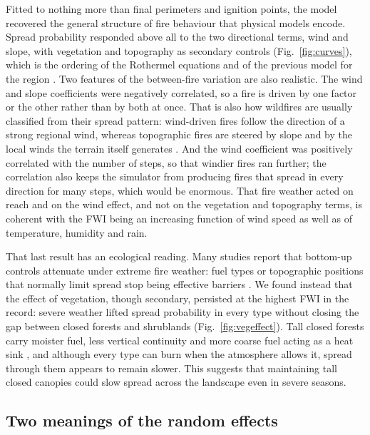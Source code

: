 \documentclass[ResearchPaper,linenum]{CSIRO_LaTeX_Template}
\begin{document}
Fitted to nothing more than final perimeters and ignition points, the model recovered
the general structure of fire behaviour that physical models encode. Spread probability
responded above all to the two directional terms, wind and slope, with vegetation and
topography as secondary controls (Fig.~\ref{fig:curves}), which is the ordering of the
Rothermel equations \citep{rothermel_mathematical_1972} and of the previous model for
the region \citep{morales_stochastic_2015}. Two features of the between-fire variation
are also realistic. The wind and slope coefficients were negatively correlated, so a fire
is driven by one factor or the other rather than by both at once. That is also how
wildfires are usually classified from their spread pattern: wind-driven fires follow the
direction of a strong regional wind, whereas topographic fires are steered by slope and
by the local winds the terrain itself generates \citep{lecina_extreme_2014}.
And the wind coefficient was positively correlated with the number of
steps, so that windier fires ran further; the correlation also keeps the simulator from
producing fires that spread in every direction for many steps, which would be enormous.
That fire weather acted on reach and on the wind effect, and not on the vegetation and
topography terms, is coherent with the FWI being an increasing function of wind speed
as well as of temperature, humidity and rain.

That last result has an ecological reading. Many studies report that bottom-up
controls attenuate under extreme fire weather: fuel types or topographic positions that
normally limit spread stop being effective barriers \citep{Podur2009, Parks2015,
Collins2019, jones_extreme_2023}. We found instead that the effect of vegetation, though
secondary, persisted at the highest FWI in the record: severe weather lifted spread
probability in every type without closing the gap between closed forests and shrublands
(Fig.~\ref{fig:vegeffect}). Tall closed forests carry moister fuel, less vertical
continuity and more coarse fuel acting as a heat sink \citep{zylstra_biophysical_2016,
barbera_microclimate_2023, tiribelli_changes_2018}, and although every type can burn when the atmosphere
allows it, spread through them appears to remain slower. This suggests that maintaining
tall closed canopies could slow spread across the landscape even in severe seasons.

\subsection*{Two meanings of the random effects}
\end{document}
